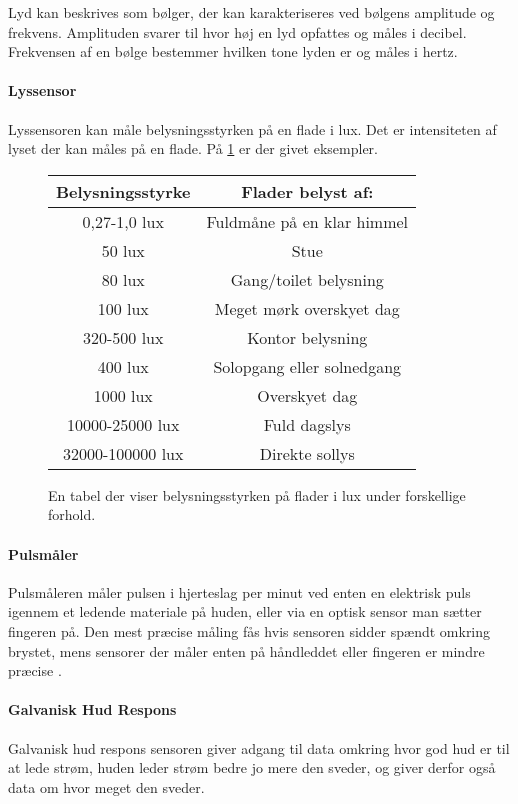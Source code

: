 Lyd kan beskrives som bølger, der kan karakteriseres ved bølgens amplitude og frekvens.
Amplituden svarer til hvor høj en lyd opfattes og måles i decibel.
Frekvensen af en bølge bestemmer hvilken tone lyden er og måles i hertz. \cite{sound}


\paragraph{Lyssensor}
Lyssensoren kan måle belysningsstyrken på en flade i lux. Det er intensiteten af lyset der kan måles på en flade. På \cref{fig:lux} er der givet eksempler.

\begin{figure}
\centering
\begin{tabular}{|c|c|}
\hline \textbf{Belysningsstyrke}    & \textbf{Flader belyst af:}\\
\hline 0,27-1,0 lux                 & Fuldmåne på en klar himmel \\
\hline 50 lux                       & Stue \\
\hline 80 lux                       & Gang/toilet belysning \\
\hline 100 lux                      & Meget mørk overskyet dag \\
\hline 320-500 lux                  & Kontor belysning \\
\hline 400 lux                      & Solopgang eller solnedgang \\
\hline 1000 lux                     & Overskyet dag \\
\hline 10000-25000 lux              & Fuld dagslys \\
\hline 32000-100000 lux             & Direkte sollys\\ \hline
\end{tabular}
\caption{En tabel der viser belysningsstyrken på flader i lux under forskellige forhold. \citep{misc:lux}}
\label{fig:lux}
\end{figure}

\paragraph{Pulsmåler}
Pulsmåleren måler pulsen i hjerteslag per minut ved enten en elektrisk puls igennem et ledende materiale på huden, eller via en optisk sensor man sætter fingeren på.
Den mest præcise måling fås hvis sensoren sidder spændt omkring brystet, mens sensorer der måler enten på håndleddet eller fingeren er mindre præcise \cite{burke1998precision}.

\paragraph{Galvanisk Hud Respons}
Galvanisk hud respons sensoren giver adgang til data omkring hvor god hud er til at lede strøm, huden leder strøm bedre jo mere den sveder, og giver derfor også data om hvor meget den sveder.